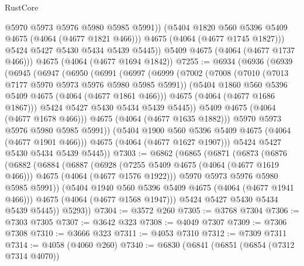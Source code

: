 \begin{lexlean}{RustCore}
\begin{coremodule}
                @5970
                @5973
                @5976
                @5980
                @5985
                @5991))
            (@5404 @1820 @560 @5396 @5409 @4675 (@4064 (@4677 @1821 @466)))
            @4675
            (@4064 (@4677 @1745 @1827)))
          @5424
          @5427
          @5430
          @5434
          @5439
          @5445))
      @5409
      @4675
      (@4064 (@4677 @1737 @466)))
    @4675
    (@4064 (@4677 @1694 @1842))
@7255 := @6934
    (@6936
      (@6939
        (@6945
          (@6947
            (@6950
              (@6991
                (@6997
                  (@6999
                    (@7002
                      (@7008
                        (@7010 (@7013 @7177 @5970 @5973 @5976 @5980 @5985 @5991))
                        (@5404 @1860 @560 @5396 @5409 @4675 (@4064 (@4677 @1861 @466)))
                        @4675
                        (@4064 (@4677 @1686 @1867)))
                      @5424
                      @5427
                      @5430
                      @5434
                      @5439
                      @5445))
                  @5409
                  @4675
                  (@4064 (@4677 @1678 @466)))
                @4675
                (@4064 (@4677 @1635 @1882)))
              @5970
              @5973
              @5976
              @5980
              @5985
              @5991))
          (@5404 @1900 @560 @5396 @5409 @4675 (@4064 (@4677 @1901 @466)))
          @4675
          (@4064 (@4677 @1627 @1907)))
        @5424
        @5427
        @5430
        @5434
        @5439
        @5445))
@7303 := @6862
    (@6865
      (@6871
        (@6873
          (@6876
            (@6882
              (@6884
                (@6887
                  (@6928
                    (@7255 @5409 @4675 (@4064 (@4677 @1619 @466)))
                    @4675
                    (@4064 (@4677 @1576 @1922)))
                  @5970
                  @5973
                  @5976
                  @5980
                  @5985
                  @5991))
              (@5404 @1940 @560 @5396 @5409 @4675 (@4064 (@4677 @1941 @466)))
              @4675
              (@4064 (@4677 @1568 @1947)))
            @5424
            @5427
            @5430
            @5434
            @5439
            @5445))
        @5293))
@7304 := @3572 @260
@7305 := @3768 @7304
@7306 := @7303 @7305
@7307 := @3642 @323
@7308 := @4049 @7307
@7309 := @7306 @7308
@7310 := @3666 @323
@7311 := @4053 @7310
@7312 := @7309 @7311
@7314 := @4058 (@4060 @260)
@7340 := @6830
    (@6841
      (@6851
        (@6854 (@7312 @7314 @4070))

\end{coremodule}
\end{lexlean}
